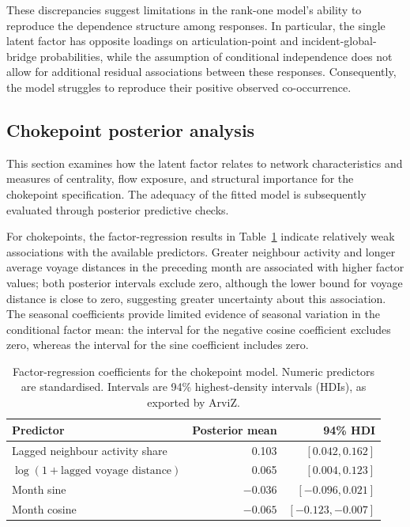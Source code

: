 \documentclass[pdftex,12pt,openright,a4paper,oneside]{book}
\begin{document}
These discrepancies suggest limitations in the rank-one model's ability to 
reproduce the dependence structure among responses. In particular, the single 
latent factor has opposite loadings on articulation-point and incident-global-bridge 
probabilities, while the assumption of conditional independence does not 
allow for additional residual associations between these responses. 
Consequently, the model struggles to reproduce their positive observed co-occurrence.

\subsection{Chokepoint posterior analysis}
\label{sec:chokepoint_findings}
This section examines how the latent factor relates to network characteristics and measures of centrality, 
flow exposure, and structural importance for the chokepoint specification. The adequacy of the 
fitted model is subsequently evaluated through posterior predictive checks.

For chokepoints, the factor-regression results in Table~\ref{tab:chokepoint_beta} indicate relatively
weak associations with the available predictors. 
Greater neighbour activity and longer average voyage distances in the preceding month are associated with higher factor values; 
both posterior intervals exclude zero, although the lower bound for voyage distance is close to zero, suggesting 
greater uncertainty about this association. 
The seasonal coefficients provide limited evidence of seasonal variation in the conditional factor mean: 
the interval for the negative cosine coefficient excludes zero, whereas the interval for the sine coefficient includes zero.

\begin{table}[htbp]
\centering
\caption{Factor-regression coefficients for the chokepoint model. Numeric predictors are standardised. Intervals are 94\% highest-density intervals (HDIs), as exported by ArviZ.}
\label{tab:chokepoint_beta}
\begin{tabular}{lrr}
\hline
Predictor & Posterior mean & 94\% HDI \\
\hline
Lagged neighbour activity share & 0.103 & $[0.042,0.162]$ \\
$\log(1+\text{lagged voyage distance})$ & 0.065 & $[0.004,0.123]$ \\
Month sine & $-0.036$ & $[-0.096,0.021]$ \\
Month cosine & $-0.065$ & $[-0.123,-0.007]$ \\
\hline
\end{tabular}
\end{table}
\end{document}
